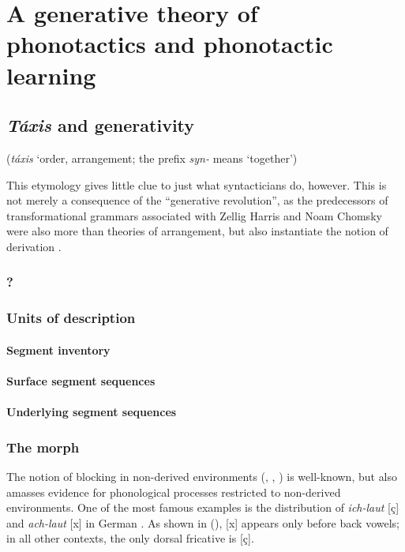 \chapter{A generative theory of phonotactics and phonotactic learning}

\section{\emph{Táxis} and generativity}

(\emph{táxis} `order, arrangement; the prefix \emph{syn-} means `together')

This etymology gives little clue to just what syntacticians do, however. This is not merely a consequence of the ``generative revolution'', as the predecessors of transformational grammars associated with Zellig Harris and Noam Chomsky were also more than theories of arrangement, but also instantiate the notion of derivation \citep[e.g.,][]{Post1943}.

\subsection{?}

\subsection{Units of description}
\subsubsection{Segment inventory}
\subsubsection{Surface segment sequences}
\subsubsection{Underlying segment sequences}

\subsection{The morph}

The notion of blocking in non-derived environments (\citealp[163]{Kiparsky1973a}, \citeyear[152]{Kiparsky1982a}, \citealp{Mascaro1976}) is well-known, but \citet{Hall2006} also amasses evidence for phonological processes restricted to non-derived environments. One of the most famous examples is the distribution of \emph{ich-laut} [ç] and \emph{ach-laut} [x] in German \citep{Bloomfield1930}. As shown in (\label{ichach}), [x] appears only before back vowels; in all other contexts, the only dorsal fricative is [ç]. 

